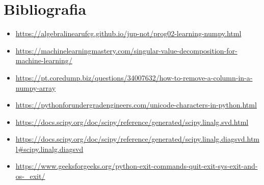 \documentclass[a4paper,12pt,twoside]{article}
\begin{document}
\section{Bibliografia}
\begin{itemize}
   \item \url{https://algebralinearufcg.github.io/jup-not/prog02-learning-numpy.html}
   \item \url{https://machinelearningmastery.com/singular-value-decomposition-for-machine-learning/}
   \item \url{https://pt.coredump.biz/questions/34007632/how-to-remove-a-column-in-a-numpy-array}
   \item \url{https://pythonforundergradengineers.com/unicode-characters-in-python.html}
   \item \url{https://docs.scipy.org/doc/scipy/reference/generated/scipy.linalg.svd.html}
   \item \url{https://docs.scipy.org/doc/scipy/reference/generated/scipy.linalg.diagsvd.html#scipy.linalg.diagsvd}
   \item \url{https://www.geeksforgeeks.org/python-exit-commands-quit-exit-sys-exit-and-os-_exit/}
 \end{itemize}
\end{document}
